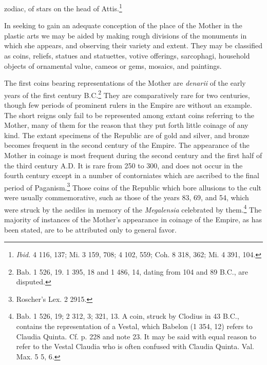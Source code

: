 \documentclass[a4paper, 11pt, oneside, polutonikogreek, english]{article}
\begin{document}
zodiac, of stars on the head of Attis.\footnote{\emph{Ibid.} 4 116, 137; Mi. 3 159, 708; 4 102, 559; Coh. 8 318, 362; Mi. 4 391, 104.}

In seeking to gain an adequate conception of the place of the Mother in the plastic arts we may be aided by making rough divisions of the monuments in which she appears, and observing their variety and extent. They may be classified as coins, reliefs, statues and statuettes, votive offerings, sarcophagi, household objects of ornamental value, cameos or gems, mosaics, and paintings.

The first coins bearing representations of the Mother are \emph{denarii} of the early years of the first century \textsc{B.C.}\footnote{Bab. 1 526, 19. 1 395, 18 and 1 486, 14, dating from 104 and 89 \textsc{B.C.}, are disputed.} They are comparatively rare for two centuries, though few periods of prominent rulers in the Empire are without an example. The short reigns only fail to be represented among extant coins referring to the Mother, many of them for the reason that they put forth little coinage of any kind. The extant specimens of the Republic are of gold and silver, and bronze becomes frequent in the second century of the Empire. The appearance of the Mother in coinage is most frequent during the second century and the first half of the third century \textsc{A.D.} It is rare from 250 to 300, and does not occur in the fourth century except in a number of contorniates which are ascribed to the final period of Paganism.\footnote{Roscher's Lex. 2 2915.} Those coins of the Republic which bore allusions to the cult were usually commemorative, such as those of the years 83, 69, and 54, which were struck by the aediles in memory of the \emph{Megalensia} celebrated by them.\footnote{Bab. 1 526, 19; 2 312, 3; 321, 13. A coin, struck by Clodius in 43 \textsc{B.C.}, contains the representation of a Vestal, which Babelon (1 354, 12) refers to Claudia Quinta. Cf. p. 228 and note 23. It may be said with equal reason to refer to the Vestal Claudia who is often confused with Claudia Quinta. Val. Max. 5 5, 6.} The majority of instances of the Mother's appearance in coinage of the Empire, as has been stated, are to be attributed only to general favor.
\end{document}
